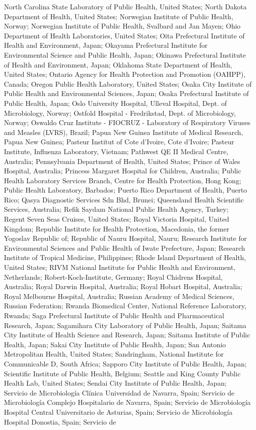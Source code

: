 \documentclass[9pt,lineno]{elife} %
\begin{document}
\begin{appendixbox}
North Carolina State Laboratory of Public Health, United States; North Dakota Department of Health, United States; Norwegian Institute of Public Health, Norway; Norwegian Institute of Public Health, Svalbard and Jan Mayen; Ohio Department of Health Laboratories, United States; Oita Prefectural Institute of Health and Environment, Japan; Okayama Prefectural Institute for Environmental Science and Public Health, Japan; Okinawa Prefectural Institute of Health and Environment, Japan; Oklahoma State Department of Health, United States; Ontario Agency for Health Protection and Promotion (OAHPP), Canada; Oregon Public Health Laboratory, United States; Osaka City Institute of Public Health and Environmental Sciences, Japan; Osaka Prefectural Institute of Public Health, Japan; Oslo University Hospital, Ulleval Hospital, Dept. of Microbiology, Norway; Ostfold Hospital - Fredrikstad, Dept. of Microbiology, Norway; Oswaldo Cruz Institute - FIOCRUZ - Laboratory of Respiratory Viruses and Measles (LVRS), Brazil; Papua New Guinea Institute of Medical Research, Papua New Guinea; Pasteur Institut of Cote d'Ivoire, Cote d'Ivoire; Pasteur Institute, Influenza Laboratory, Vietnam; Pathwest QE II Medical Centre, Australia; Pennsylvania Department of Health, United States; Prince of Wales Hospital, Australia; Princess Margaret Hospital for Children, Australia; Public Health Laboratory Services Branch, Centre for Health Protection, Hong Kong; Public Health Laboratory, Barbados; Puerto Rico Department of Health, Puerto Rico; Qasya Diagnostic Services Sdn Bhd, Brunei; Queensland Health Scientific Services, Australia; Refik Saydam National Public Health Agency, Turkey; Regent Seven Seas Cruises, United States; Royal Victoria Hospital, United Kingdom; Republic Institute for Health Protection, Macedonia, the former Yogoslav Republic of; Republic of Nauru Hospital, Nauru; Research Institute for Environmental Sciences and Public Health of Iwate Prefecture, Japan; Research Institute of Tropical Medicine, Philippines; Rhode Island Department of Health, United States; RIVM National Institute for Public Health and Environment, Netherlands; Robert-Koch-Institute, Germany; Royal Chidrens Hospital, Australia; Royal Darwin Hospital, Australia; Royal Hobart Hospital, Australia; Royal Melbourne Hospital, Australia; Russian Academy of Medical Sciences, Russian Federation; Rwanda Biomedical Center, National Reference Laboratory, Rwanda; Saga Prefectural Institute of Public Health and Pharmaceutical Research, Japan; Sagamihara City Laboratory of Public Health, Japan; Saitama City Institute of Health Science and Research, Japan; Saitama Institute of Public Health, Japan; Sakai City Institute of Public Health, Japan; San Antonio Metropolitan Health, United States; Sandringham, National Institute for Communicable D, South Africa; Sapporo City Institute of Public Health, Japan; Scientific Institute of Public Health, Belgium; Seattle and King County Public Health Lab, United States; Sendai City Institute of Public Health, Japan; Servicio de Microbiología Clínica Universidad de Navarra, Spain; Servicio de Microbiología Complejo Hospitalario de Navarra, Spain; Servicio de Microbiología Hospital Central Universitario de Asturias, Spain; Servicio de Microbiología Hospital Donostia, Spain; Servicio de 
\end{appendixbox}
\end{document}
